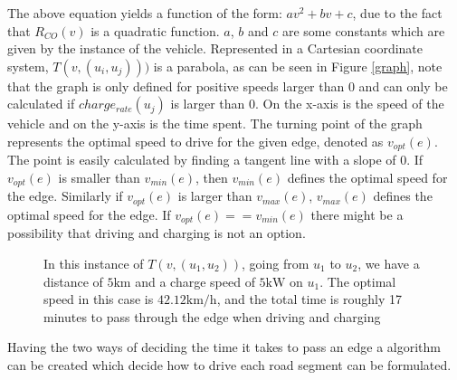 The above equation yields a function of the form: $av^2 + bv + c$, due to the fact that $R_{CO}(v)$ is a quadratic function. $a$, $b$ and $c$ are some constants which are given by the instance of the vehicle. Represented in a Cartesian coordinate system, $T(v,(u_i, u_j)))$ is a parabola, as can be seen in Figure \ref{graph}, note that the graph is only defined for positive speeds larger than $0$ and can only be calculated if $charge_{rate}(u_j)$ is larger than $0$. On the x-axis is the speed of the vehicle and on the y-axis is the time spent. The turning point of the graph represents the optimal speed to drive for the given edge, denoted as $v_{opt}(e)$. The point is easily calculated by finding a tangent line with a slope of $0$. If $v_{opt}(e)$ is smaller than $v_{min}(e)$, then $v_{min}(e)$ defines the optimal speed for the edge. Similarly if $v_{opt}(e)$ is larger than $v_{max}(e)$, $v_{max}(e)$ defines the optimal speed for the edge. If $v_{opt}(e) == v_{min}(e)$ there might be a possibility that driving and charging is not an option. 

\begin{figure}[!htb]
% 
\caption{In this instance of $T(v,(u_1, u_2))$, going from $u_1$ to $u_2$, we have a distance of $5 \si{\km}$ and a charge speed of $5 \si{\kW}$ on $u_1$. The optimal speed in this case is $42.12\si{\km\per\hour}$, and the total time is roughly 17 minutes to pass through the edge when driving and charging}
\end{figure}\label{graph}
Having the two ways of deciding the time it takes to pass an edge a algorithm can be created which decide how to drive each road segment can be formulated.   


